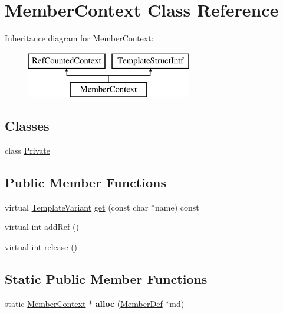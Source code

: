 \hypertarget{class_member_context}{}\section{Member\+Context Class Reference}
\label{class_member_context}
Inheritance diagram for Member\+Context\+:\begin{figure}[H]
\begin{center}
\leavevmode
\includegraphics[height=2.000000cm]{class_member_context}
\end{center}
\end{figure}
\subsection*{Classes}
\begin{DoxyCompactItemize}
\item 
class \mbox{\hyperlink{class_member_context_1_1_private}{Private}}
\end{DoxyCompactItemize}
\subsection*{Public Member Functions}
\begin{DoxyCompactItemize}
\item 
virtual \mbox{\hyperlink{class_template_variant}{Template\+Variant}} \mbox{\hyperlink{class_member_context_ab9b8559215dd4bcfef722c04c0d4a375}{get}} (const char $\ast$name) const
\item 
virtual int \mbox{\hyperlink{class_member_context_abe50fc6291c9d139677b7a8263831d89}{add\+Ref}} ()
\item 
virtual int \mbox{\hyperlink{class_member_context_a92d2b4bfdec4af678bf20c69891fac29}{release}} ()
\end{DoxyCompactItemize}
\subsection*{Static Public Member Functions}
\begin{DoxyCompactItemize}
\item 
\mbox{\label{class_member_context_a2ec32013bfbba2255c64937529d5d5d6}} 
static \mbox{\hyperlink{class_member_context}{Member\+Context}} $\ast$ {\bfseries alloc} (\mbox{\hyperlink{class_member_def}{Member\+Def}} $\ast$md)
\end{DoxyCompactItemize}


